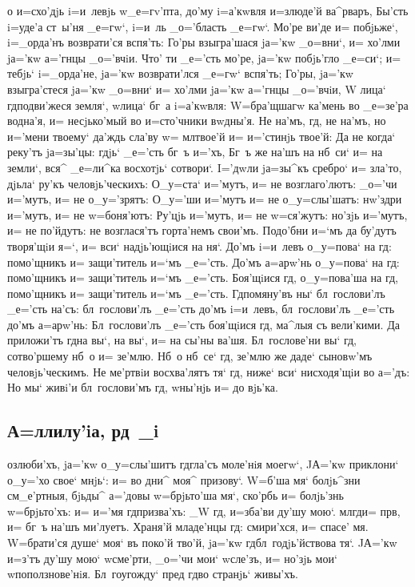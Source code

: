 \documentclass[12pt,a6paper,twoside,dvips,civil=antiqua,cs=izhitsa]{hipbook}
\begin{document}
о и=схо'дjь i=и~левjь w\т _е=гv'пта, до'му i=а'кwвля и=з\ъ люде'й
ва^рваръ, Бы'сть i=уде'а ст~ы'ня _е=гw`, i=и~ль _о='бласть _е=гw`. Мо'ре ви'де
и= побjьже`, i=_орда'нъ возврати'ся вспя'ть: Го'ры взыгра'шася jа='кw _о=вни`,
и= хо'лми jа='кw а='гнцы _о='вчiи. Что' ти _е='сть мо'ре, jа='кw побjь'гло
_е=си`; и= тебjь` i=_орда'не, jа='кw возврати'лся _е=гw` вспя'ть; Го'ры,
jа='кw взыгра'стеся jа='кw _о=вни` и= хо'лми jа='кw а='гнцы _о='вчiи, W\т
лица` гд подви'жеся земля`, w\т лица` бг~а i=а'кwвля: W=бра'щшагw ка'мень
во _е=зе'ра водна'я, и= несjько'мый во и=сто'чники вwдны'я. Не на'мъ, гд,
не на'мъ, но и='мени твоему` да'ждь сла'ву w= мл твое'й и= и='стинjь
твое'й: Да не когда` реку'тъ jа=зы'цы: гдjь` _е='сть бг~ъ и='хъ, Бг~ъ же на'шъ
на нб~си` и= на земли`, вся^ _е=ли^ка восхотjь` сотвори`. I='дwли jа=зы^къ
сребро` и= зла'то, дjьла` ру'къ человjь'ческихъ: О_у=ста` и='мутъ, и= не
возглаго'лютъ: _о='чи и='мутъ, и= не о_у='зрятъ: О_у='ши и='мутъ и= не
о_у=слы'шатъ: нw'здри и='мутъ, и= не w=боня'ютъ: Ру'цjь и='мутъ, и= не
w=ся'жутъ: но'зjь и='мутъ, и= не по'йдутъ: не возглася'тъ горта'немъ
свои'мъ. Подо'бни и=`мъ да бу'дутъ творя'щiи я=`, и= вси` надjь'ющiися на
ня`. До'мъ i=и~левъ о_у=пова` на гд: помо'щникъ и= защи'титель и=`мъ
_е='сть. До'мъ а=арw'нь о_у=пова` на гд: помо'щникъ и= защи'титель и=`мъ
_е='сть. Боя'щiися гд, о_у=пова'ша на гд, помо'щникъ и= защи'титель
и=`мъ _е='сть. Гд помяну'въ ны` бл~гослови'лъ _е='сть на'съ: бл~гослови'лъ
_е='сть до'мъ i=и~левъ, бл~гослови'лъ _е='сть до'мъ а=арw'нь: Бл~гослови'лъ
_е='сть боя'щiися гд, ма^лыя съ вели'кими. Да приложи'тъ гд на вы`, на
вы`, и= на сы'ны ва'шя. Бл~гослове'ни вы` гд, сотво'ршему нб~о и=
зе'млю. Нб~о нб~се` гд, зе'млю же даде` сыновw'мъ человjь'ческимъ. Не
ме'ртвiи восхва'лятъ тя` гд, ниже` вси` нисходя'щiи во а='дъ: Но мы` живi'и
бл~гослови'мъ гд, w\т ны'нjь и= до вjь'ка.

\delimpict

\subsection{А=ллилу'iа, рд~_i}

озлюби'хъ, jа='кw о_у=слы'шитъ гд гла'съ моле'нiя моегw`, JА='кw
приклони` о_у='хо свое` мнjь`: и= во дни^ моя^ призову`. W=б'ша мя`
болjь^зни см_е'ртныя, бjьды^ а='довы w=брjьто'ша мя`, ско'рбь и= болjь'знь
w=брjьто'хъ: и= и='мя гд призва'хъ: _W гд, и=зба'ви ду'шу
мою`. мл гд и= прв, и= бг~ъ на'шъ ми'луетъ. Храня'й младе'нцы
гд: смири'хся, и= спасе' мя. W=брати'ся душе` моя` въ поко'й тво'й, jа='кw
гд бл~годjь'йствова тя`. JА='кw и=з'тъ ду'шу мою` w\т сме'рти, _о='чи
мои` w\т сле'зъ, и= но'зjь мои` w\т поползнове'нiя. Бл~гоугожду` пред\ъ
гд во странjь` живы'хъ.
\end{document}
